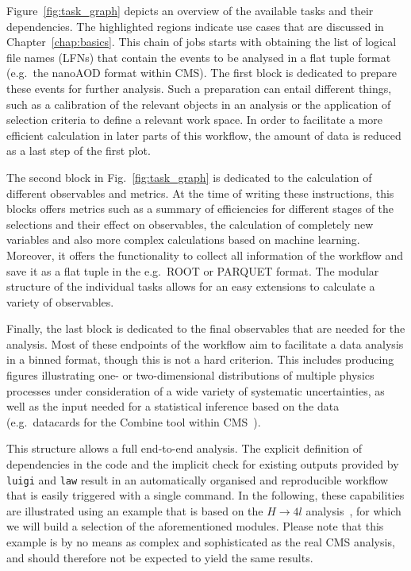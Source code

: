 Figure~\ref{fig:task_graph} depicts an overview of the available tasks and their dependencies.
The highlighted regions indicate use cases that are discussed in Chapter~\ref{chap:basics}.
This chain of jobs starts with obtaining the list of logical file names (LFNs) that contain the events to be analysed in a flat tuple format (e.g.\ the nanoAOD format within CMS).
The first block is dedicated to prepare these events for further analysis.
Such a preparation can entail different things, such as a calibration of the relevant objects in an analysis or the application of selection criteria to define a relevant work space.
In order to facilitate a more efficient calculation in later parts of this workflow, the amount of data is reduced as a last step of the first plot.

The second block in Fig.~\ref{fig:task_graph} is dedicated to the calculation of different observables and metrics.
At the time of writing these instructions, this blocks offers metrics such as a summary of efficiencies for different stages of the selections and their effect on observables, the calculation of completely new variables and also more complex calculations based on machine learning.
Moreover, it offers the functionality to collect all information of the workflow and save it as a flat tuple in the e.g.\ ROOT or PARQUET format.
The modular structure of the individual tasks allows for an easy extensions to calculate a variety of observables.

Finally, the last block is dedicated to the final observables that are needed for the analysis.
Most of these endpoints of the workflow aim to facilitate a data analysis in a binned format, though this is not a hard criterion.
This includes producing figures illustrating one- or two-dimensional distributions of multiple physics processes under consideration of a wide variety of systematic uncertainties, as well as the input needed for a statistical inference based on the data (e.g.\ datacards for the Combine tool within CMS~\cite{combine}).

This structure allows a full end-to-end analysis.
The explicit definition of dependencies in the code and the implicit check for existing outputs provided by \texttt{luigi} and \texttt{law} result in an automatically organised and reproducible workflow that is easily triggered with a single command.
In the following, these capabilities are illustrated using an example that is based on the $H\rightarrow4l$ analysis~\cite{h4l_analysis}, for which we will build a selection of the aforementioned modules.
Please note that this example is by no means as complex and sophisticated as the real CMS analysis, and should therefore not be expected to yield the same results.
